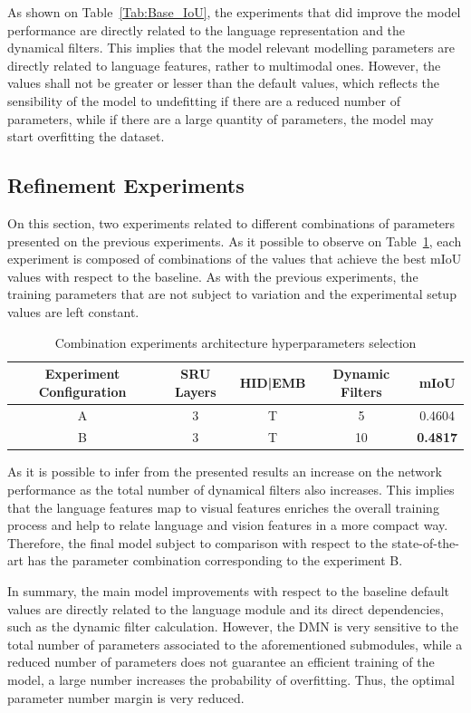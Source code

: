 As shown on Table~\ref{Tab:Base_IoU}, the experiments that did improve the model performance are directly related to the language representation and the dynamical filters. This implies that the model relevant modelling parameters are directly related to language features, rather to multimodal ones. However, the values shall not be greater or lesser than the default values, which reflects the sensibility of the model to undefitting if there are a reduced number of parameters, while if there are a large quantity of parameters, the model may start overfitting the dataset.

\subsection{Refinement Experiments}
\label{section:refinement}
On this section, two experiments related to different combinations of parameters presented on the previous experiments. As it possible to observe on Table~\ref{Tab:Comb_Exp}, each experiment is composed of combinations of the values that achieve the best mIoU values with respect to the baseline. As with the previous experiments, the training parameters that are not subject to variation and the experimental setup values are left constant.

\begin{table}[!htbp]
    \centering
    \begin{tabular}{|c|c|c|c|c|}
        \hline
        Experiment Configuration & SRU Layers & HID|EMB & Dynamic Filters & mIoU  \\
        \hline
        A & 3 & T & 5 & 0.4604 \\
        \hline
        B & 3 & T & 10 & \textbf{0.4817} \\
        \hline
    \end{tabular}
    \caption{Combination experiments architecture hyperparameters selection}
    \label{Tab:Comb_Exp}
\end{table}

As it is possible to infer from the presented results an increase on the network performance as the total number of dynamical filters also increases. This implies that the language features map to visual features enriches the overall training process and help to relate language and vision features in a more compact way. Therefore, the final model subject to comparison with respect to the state-of-the-art has the parameter combination corresponding to the experiment B.

In summary, the main model improvements with respect to the baseline default values are directly related to the language module and its direct dependencies, such as the dynamic filter calculation. However, the DMN is very sensitive to the total number of parameters associated to the aforementioned submodules, while a reduced number of parameters does not guarantee an efficient training of the model, a large number increases the probability of overfitting. Thus, the optimal parameter number margin is very reduced. 

